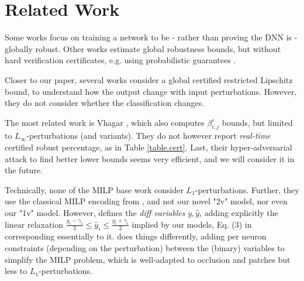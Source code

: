 \section{Related Work}

Some works \cite{Leino,Zhang22a,Sun22,Chen21,REGLO} focus on training a network to be - rather than proving the DNN is - globally robust.
Other works \cite{Bastani16,Ruan19,Gopinath18} estimate global robustness bounds, but without hard verification certificates, e.g. using probabilistic guarantees 
\cite{Levy23,Mangal19}.

Closer to our paper, several works  \cite{Marabou,lipshitz,GROCET} consider a global certified restricted Lipschitz bound, to understand how the output change with input perturbations. However, they do not consider whether the classification changes. 

The most related work is Vhagar \cite{vhagar}, which also computes $\beta^\varepsilon_{i,j}$ bounds, but limited to $L_\infty$-perturbations (and variants). They do not however report {\em real-time} certified robust percentage, as in Table \ref{table.cert}. Last, their hyper-adversarial attack to find better lower bounds seems very efficient, and we will consider it in the future.

Technically, none of the MILP base work \cite{vhagar,ITNE} 
consider $L_1$-perturbations. Further, they use the classical MILP encoding from \cite{MILP}, and not our novel "2v" model, nor even our "1v" model. However, \cite{ITNE} 
defines the {\em diff variables} $y,\hat{y}$, adding explicitly the linear relaxation $\frac{y_i-\gamma_i}{2} \leq \hat{y}_i \leq \frac{y_i+\gamma_i}{2}$ implied by our models, Eq. (3) in \cite{ITNE} corresponding essentially to it. \cite{vhagar} does things differently, adding per neuron constraints (depending on the perturbation) between the (binary) variables to simplify the MILP problem, which is well-adapted to occlusion and patches but less to $L_1$-perturbations. 

